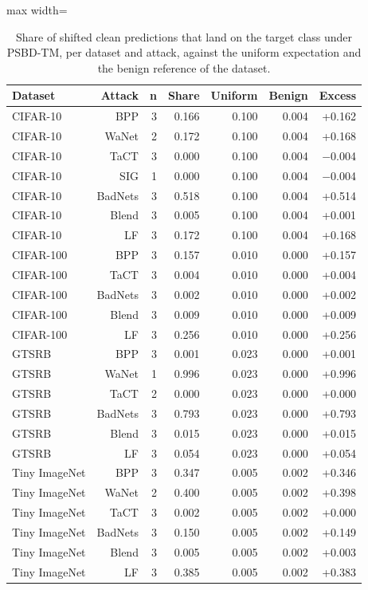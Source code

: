 \begin{table}[htbp]
\centering
\small
\caption{Share of shifted clean predictions that land on the target class under PSBD-TM, per dataset and attack, against the uniform expectation and the benign reference of the dataset.}
\label{tab:mech-shift-target-by-dataset}
\begin{adjustbox}{max width=\linewidth}
\begin{tabular}{lrrrrrr}
\toprule
Dataset & Attack & n & Share & Uniform & Benign & Excess \\
\midrule
CIFAR-10 & BPP & 3 & 0.166 & 0.100 & 0.004 & +0.162 \\
CIFAR-10 & WaNet & 2 & 0.172 & 0.100 & 0.004 & +0.168 \\
CIFAR-10 & TaCT & 3 & 0.000 & 0.100 & 0.004 & $-$0.004 \\
CIFAR-10 & SIG & 1 & 0.000 & 0.100 & 0.004 & $-$0.004 \\
CIFAR-10 & BadNets & 3 & 0.518 & 0.100 & 0.004 & +0.514 \\
CIFAR-10 & Blend & 3 & 0.005 & 0.100 & 0.004 & +0.001 \\
CIFAR-10 & LF & 3 & 0.172 & 0.100 & 0.004 & +0.168 \\
CIFAR-100 & BPP & 3 & 0.157 & 0.010 & 0.000 & +0.157 \\
CIFAR-100 & TaCT & 3 & 0.004 & 0.010 & 0.000 & +0.004 \\
CIFAR-100 & BadNets & 3 & 0.002 & 0.010 & 0.000 & +0.002 \\
CIFAR-100 & Blend & 3 & 0.009 & 0.010 & 0.000 & +0.009 \\
CIFAR-100 & LF & 3 & 0.256 & 0.010 & 0.000 & +0.256 \\
GTSRB & BPP & 3 & 0.001 & 0.023 & 0.000 & +0.001 \\
GTSRB & WaNet & 1 & 0.996 & 0.023 & 0.000 & +0.996 \\
GTSRB & TaCT & 2 & 0.000 & 0.023 & 0.000 & +0.000 \\
GTSRB & BadNets & 3 & 0.793 & 0.023 & 0.000 & +0.793 \\
GTSRB & Blend & 3 & 0.015 & 0.023 & 0.000 & +0.015 \\
GTSRB & LF & 3 & 0.054 & 0.023 & 0.000 & +0.054 \\
Tiny ImageNet & BPP & 3 & 0.347 & 0.005 & 0.002 & +0.346 \\
Tiny ImageNet & WaNet & 2 & 0.400 & 0.005 & 0.002 & +0.398 \\
Tiny ImageNet & TaCT & 3 & 0.002 & 0.005 & 0.002 & +0.000 \\
Tiny ImageNet & BadNets & 3 & 0.150 & 0.005 & 0.002 & +0.149 \\
Tiny ImageNet & Blend & 3 & 0.005 & 0.005 & 0.002 & +0.003 \\
Tiny ImageNet & LF & 3 & 0.385 & 0.005 & 0.002 & +0.383 \\
\bottomrule
\end{tabular}
\end{adjustbox}
\end{table}
